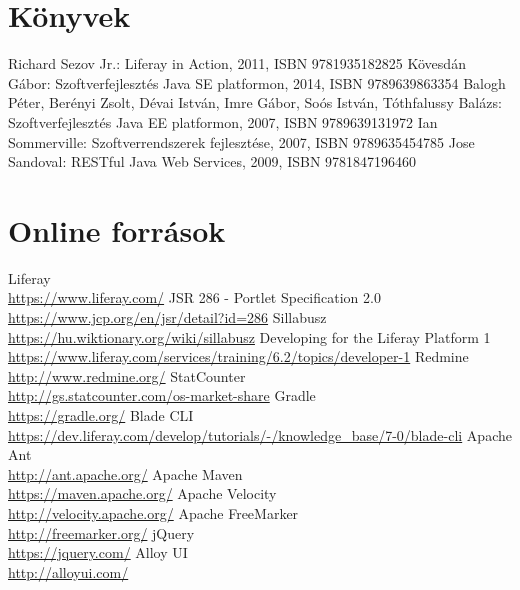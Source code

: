 \documentclass[hidelinks, 12pt, a4paper]{report}
\begin{document}

\clearpage
{}
\begin{thebibliography}{10}

\section*{Könyvek}

 Richard Sezov Jr.: Liferay in Action, 2011, ISBN 9781935182825
 Kövesdán Gábor: Szoftverfejlesztés Java SE platformon, 2014, ISBN 9789639863354
 Balogh Péter, Berényi Zsolt, Dévai István, Imre Gábor, Soós István, Tóthfalussy Balázs: Szoftverfejlesztés Java EE platformon, 2007, ISBN 9789639131972
 Ian Sommerville: Szoftverrendszerek fejlesztése, 2007, ISBN 9789635454785
 Jose Sandoval: RESTful Java Web Services, 2009, ISBN 9781847196460

\section*{Online források}

 Liferay \\ \small\url{https://www.liferay.com/}
 JSR 286 - Portlet Specification 2.0 \\ \small\url{https://www.jcp.org/en/jsr/detail?id=286}
 Sillabusz \\ \small\url{https://hu.wiktionary.org/wiki/sillabusz}
 Developing for the Liferay Platform 1 \\ \small\url{https://www.liferay.com/services/training/6.2/topics/developer-1}
 Redmine \\ \small\url{http://www.redmine.org/}
 StatCounter \\ \small\url{http://gs.statcounter.com/os-market-share}
 Gradle \\ \small\url{https://gradle.org/}
 Blade CLI \\ \small\url{https://dev.liferay.com/develop/tutorials/-/knowledge_base/7-0/blade-cli}
 Apache Ant \\ \small\url{http://ant.apache.org/}
 Apache Maven \\ \small\url{https://maven.apache.org/}
 Apache Velocity \\ \small\url{http://velocity.apache.org/}
 Apache FreeMarker \\ \small\url{http://freemarker.org/}
 jQuery \\ \small\url{https://jquery.com/}
 Alloy UI \\ \small\url{http://alloyui.com/}

\end{thebibliography}
\end{document}
